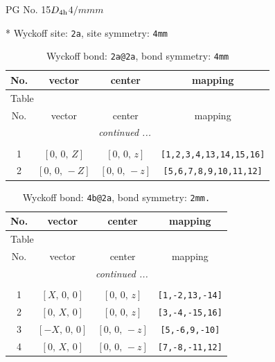 \documentclass[fleqn,8pt]{jsarticle}
\begin{document}
\setcounter{MaxMatrixCols}{32}

\renewcommand{\tablename}{Table~}
\renewcommand{\figurename}{Figure~}
\begin{center}
\LARGE
PG No. 15\quad$D_{\rm 4h}$\quad$4/mmm$\quad[ tetragonal ]
\end{center}


* Wyckoff site: {\tt 2a}, site symmetry: {\tt 4mm}
\renewcommand{\arraystretch}{1.2}
\begin{longtable}{cccc}
\caption{Wyckoff bond: {\tt 2a@2a}, bond symmetry: {\tt 4mm}}
 \\
 \hline \hline
No. & vector & center & mapping \\ \hline \endfirsthead

\multicolumn{3}{l}{\tablename\ \thetable{}} \\
 \hline \hline
No. & vector & center & mapping \\ \hline \endhead

 \hline \hline
\multicolumn{3}{r}{\footnotesize\it continued ...} \\ \endfoot

 \hline \hline
\multicolumn{3}{r}{} \\ \endlastfoot

1 & $\left[ 0,\, 0,\, Z \right]$ & $\left[ 0,\, 0,\, z \right]$ & {\tt [1,2,3,4,13,14,15,16]} \\ \hline
2 & $\left[ 0,\, 0,\, - Z \right]$ & $\left[ 0,\, 0,\, - z \right]$ & {\tt [5,6,7,8,9,10,11,12]} \\
\end{longtable}
\renewcommand{\arraystretch}{1.2}
\begin{longtable}{cccc}
\caption{Wyckoff bond: {\tt 4b@2a}, bond symmetry: {\tt 2mm.}}
 \\
 \hline \hline
No. & vector & center & mapping \\ \hline \endfirsthead

\multicolumn{3}{l}{\tablename\ \thetable{}} \\
 \hline \hline
No. & vector & center & mapping \\ \hline \endhead

 \hline \hline
\multicolumn{3}{r}{\footnotesize\it continued ...} \\ \endfoot

 \hline \hline
\multicolumn{3}{r}{} \\ \endlastfoot

1 & $\left[ X,\, 0,\, 0 \right]$ & $\left[ 0,\, 0,\, z \right]$ & {\tt [1,-2,13,-14]} \\ \hline
2 & $\left[ 0,\, X,\, 0 \right]$ & $\left[ 0,\, 0,\, z \right]$ & {\tt [3,-4,-15,16]} \\ \hline
3 & $\left[ - X,\, 0,\, 0 \right]$ & $\left[ 0,\, 0,\, - z \right]$ & {\tt [5,-6,9,-10]} \\ \hline
4 & $\left[ 0,\, X,\, 0 \right]$ & $\left[ 0,\, 0,\, - z \right]$ & {\tt [7,-8,-11,12]} \\
\end{longtable}
\end{document}
